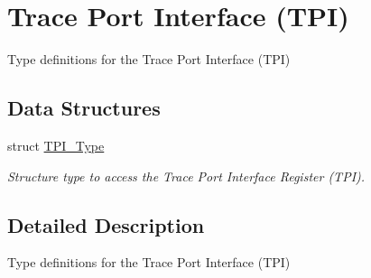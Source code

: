 \hypertarget{group___c_m_s_i_s___t_p_i}{\section{Trace Port Interface (T\-P\-I)}
\label{group___c_m_s_i_s___t_p_i}
}


Type definitions for the Trace Port Interface (T\-P\-I)  


\subsection*{Data Structures}
\begin{DoxyCompactItemize}
\item 
struct \hyperlink{struct_t_p_i___type}{T\-P\-I\-\_\-\-Type}
\begin{DoxyCompactList}\small\item\em Structure type to access the Trace Port Interface Register (T\-P\-I). \end{DoxyCompactList}\end{DoxyCompactItemize}


\subsection{Detailed Description}
Type definitions for the Trace Port Interface (T\-P\-I) 